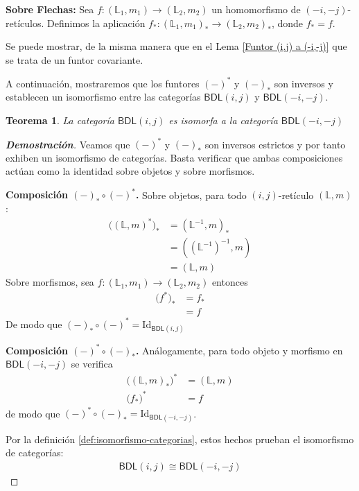 \documentclass[12pt]{book}
\newtheorem{theorem}{Teorema}[section]
\newcommand{\Id}{\mathrm{Id}}
\newcommand{\BDL}{\mathsf{BDL}}
\begin{document}
\noindent \textbf{Sobre Flechas:} Sea $f \colon (\mathbb{L}_{1},m_{1}) \to (\mathbb{L}_{2},m_{2})$ un homomorfismo de $(-i,-j)$-retículos. Definimos la aplicación $f_{*} \colon (\mathbb{L}_{1},m_{1})_{*} \to (\mathbb{L}_{2},m_{2})_{*}$, donde $f_{*} = f$.

Se puede mostrar, de la misma manera que en el Lema \ref{Funtor (i,j) a (-i,-j)} que se trata de un funtor covariante.


A continuación, mostraremos que los funtores $(-)^{*}$ y $(-)_{*}$ son inversos y establecen un isomorfismo entre las categorías $\BDL(i,j)$ y $\BDL(-i,-j)$.
\begin{theorem}\label{Equivalencia de $BDL(i,j)$} La categoría $\BDL(i,j)$ es isomorfa a la categoría $\BDL(-i,-j)$
\end{theorem}

\begin{proof}[\textbf{Demostración}]

Veamos que $(-)^{*}$ y $(-)_{*}$ son inversos estrictos y por tanto exhiben un isomorfismo de categorías. Basta verificar que ambas composiciones actúan como la identidad sobre objetos y sobre morfismos.

\medskip
\noindent\textbf{Composición $(-)_{*} \circ (-)^{*}$.}
Sobre objetos, para todo $(i,j)$-retículo  $(\mathbb{L},m)$:
\begin{align*}
\bigl((\mathbb{L},m)^{*}\bigr)_{*}
&= (\mathbb{L}^{-1},m)_{*} \\
&= ((\mathbb{L}^{-1})^{-1},m) \\
&= (\mathbb{L},m)
\end{align*}
Sobre morfismos, sea $f\colon(\mathbb{L}_1,m_1)\to(\mathbb{L}_2,m_2)$ entonces
\begin{align*}
\bigl(f^{*}\bigr)_{*}
&= f_{*}\\
&= f
\end{align*}
De modo que $(-)_{*}\circ(-)^{*}=\Id_{\BDL(i,j)}$

\medskip
\noindent\textbf{Composición $(-)^{*} \circ (-)_{*}$.}
Análogamente, para todo objeto y morfismo en $\BDL(-i,-j)$ se verifica
\begin{align*}
\bigl((\mathbb{L},m)_{*}\bigr)^{*}&=(\mathbb{L},m)\\
\bigl(f_{*}\bigr)^{*}&=f
\end{align*}
de modo que $(-)^{*}\circ(-)_{*}=\Id_{\BDL(-i,-j)}$.

\medskip
Por la definición \ref{def:isomorfismo-categorias}, estos hechos prueban el isomorfismo de categorías:
\begin{align*}
\BDL(i,j)\cong\BDL(-i,-j)
\end{align*}
\end{proof}
\end{document}
